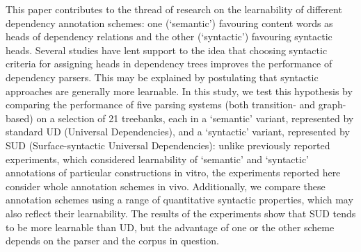 This paper contributes to the thread of research on the learnability of different dependency annotation schemes: one (‘semantic') favouring content words as heads of dependency relations and the other (‘syntactic') favouring syntactic heads. Several studies have lent support to the idea that choosing syntactic criteria for assigning heads in dependency trees improves the performance of dependency parsers. This may be explained by postulating that syntactic approaches are generally more learnable. In this study, we test this hypothesis by comparing the performance of five parsing systems (both transition- and graph-based) on a selection of 21 treebanks, each in a ‘semantic' variant, represented by standard UD (Universal Dependencies), and a ‘syntactic' variant, represented by SUD (Surface-syntactic Universal Dependencies): unlike previously reported experiments, which considered learnability of ‘semantic' and ‘syntactic' annotations of particular constructions in vitro, the experiments reported here consider whole annotation schemes in vivo. Additionally, we compare these annotation schemes using a range of quantitative syntactic properties, which may also reflect their learnability. The results of the experiments show that SUD tends to be more learnable than UD, but the advantage of one or the other scheme depends on the parser and the corpus in question.
